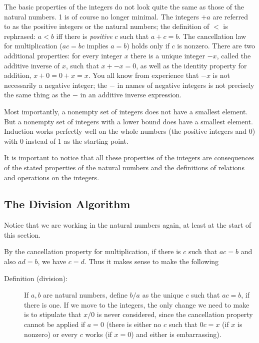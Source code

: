 \documentclass[12pt]{article}
\begin{document}
The basic properties of the integers do not look quite the same as those of the natural numbers.   1 is of course no longer minimal.
The integers $+a$ are referred to as the positive integers or the natural numbers; the definition of
$<$ is rephrased:  $a<b$ iff there is {\em positive\/} $c$ such that $a+c=b$.   The cancellation law for multiplication ($ac=bc$ implies $a=b$) holds only if $c$ is nonzero.   There are two additional properties:  for every integer $x$ there is a unique integer $-x$, called the additive inverse of $x$, such that $x+ -x=0$, as well as the identity property for addition, $x+0=0+x=x$.  You all know from experience that $-x$ is not necessarily a negative integer; the $-$ in names of negative integers is not precisely the same thing as the $-$ in an additive inverse expression.

Most importantly, a nonempty set of integers does not have a smallest element.  But a nonempty set of integers with a lower bound does have a smallest element.   Induction works perfectly well on the whole numbers (the positive integers and 0) with 0 instead of 1 as the starting point.

It is important to notice that all these properties of the integers are consequences of the stated properties of the natural numbers and the definitions of relations and operations on the integers.

\subsection{The Division Algorithm}

Notice that we are working in the natural numbers again, at least at the start of this section.

By the cancellation property for multiplication, if there is $c$ such that $ac=b$ and also $ad=b$, we have $c=d$.
Thus it makes sense to make the following

\begin{description}
\item[Definition (division):]   If $a,b$ are natural numbers, define $b/a$ as the unique $c$ such that $ac=b$, if there is one. If we move to the integers, the only
change we need to make is to stipulate that $x/0$ is never considered, since the cancellation property cannot be applied if $a=0$ (there is either no $c$ such that $0c=x$ (if $x$ is nonzero) or every $c$ works (if $x=0$) and either is embarrassing).
\end{description}
\end{document}
